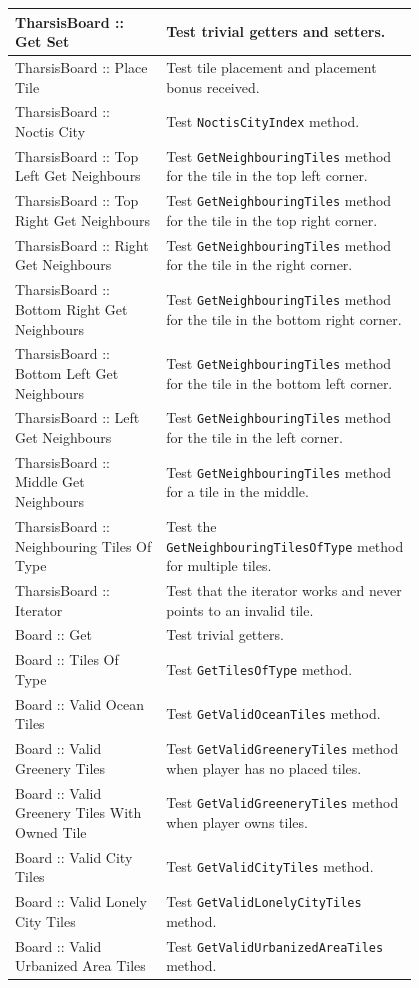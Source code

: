 \begin{center}
\begin{longtable}{ | m{0.3\linewidth} | m{0.5\linewidth} | }
        TharsisBoard :: Get Set & Test trivial getters and setters. \\
        \hline
        TharsisBoard :: Place Tile & Test tile placement and placement bonus received. \\
        \hline
        TharsisBoard :: Noctis City & Test \texttt{NoctisCityIndex} method. \\
        \hline
        TharsisBoard :: Top Left  Get Neighbours & Test \texttt{GetNeighbouringTiles} method for the tile in the top left corner. \\
        \hline
        TharsisBoard :: Top Right Get Neighbours & Test \texttt{GetNeighbouringTiles} method for the tile in the top right corner. \\
        \hline
        TharsisBoard :: Right Get Neighbours & Test \texttt{GetNeighbouringTiles} method for the tile in the right corner. \\
        \hline
        TharsisBoard :: Bottom Right Get Neighbours & Test \texttt{GetNeighbouringTiles} method for the tile in the bottom right corner. \\
        \hline
        TharsisBoard :: Bottom Left Get Neighbours & Test \texttt{GetNeighbouringTiles} method for the tile in the bottom left corner. \\
        \hline
        TharsisBoard :: Left Get Neighbours & Test \texttt{GetNeighbouringTiles} method for the tile in the left corner. \\
        \hline
        TharsisBoard :: Middle Get Neighbours & Test \texttt{GetNeighbouringTiles} method for a tile in the middle. \\
        \hline
        TharsisBoard :: Neighbouring Tiles Of Type & Test the \texttt{GetNeighbouringTilesOfType} method for multiple tiles. \\
        \hline
        TharsisBoard :: Iterator & Test that the iterator works and never points to an invalid tile. \\
        \hline

        Board :: Get & Test trivial getters. \\
        \hline
        Board :: Tiles Of Type & Test \texttt{GetTilesOfType} method. \\
        \hline
        Board :: Valid Ocean Tiles & Test \texttt{GetValidOceanTiles} method. \\
        \hline
        Board :: Valid Greenery Tiles & Test \texttt{GetValidGreeneryTiles} method  when player has no placed tiles. \\
        \hline
        Board :: Valid Greenery Tiles With Owned Tile & Test \texttt{GetValidGreeneryTiles} method  when player owns tiles. \\
        \hline
        Board :: Valid City Tiles & Test \texttt{GetValidCityTiles} method. \\
        \hline
        Board :: Valid Lonely City Tiles & Test \texttt{GetValidLonelyCityTiles} method. \\
        \hline
        Board :: Valid Urbanized Area Tiles & Test \texttt{GetValidUrbanizedAreaTiles} method. \\
        \hline


\end{longtable}
\end{center}
